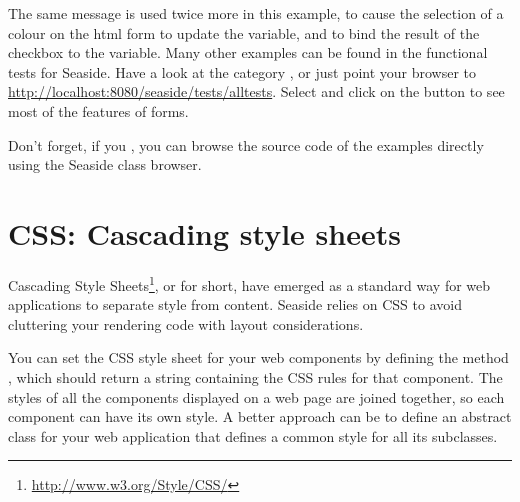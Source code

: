 \documentclass[a4paper,10pt,twoside]{book}
\begin{document}
{{The same message is used twice more in this example, to cause the selection of a colour on the html form to update the  variable, and to bind the result of the checkbox to the  variable.
Many other examples can be found in the functional tests for Seaside.
Have a look at the category , or just point your browser to \url{http://localhost:8080/seaside/tests/alltests}.
Select  and click on the  button to see most of the features of forms.

Don't forget, if you , you can browse the source code of the examples directly using the Seaside class browser.

\section{CSS: Cascading style sheets}


Cascading Style Sheets\footnote{\url{http://www.w3.org/Style/CSS/}}, or  for short, have emerged as a standard way for web applications to separate style from content.
Seaside relies on CSS to avoid cluttering your rendering code with layout considerations.

You can set the CSS style sheet for your web components by defining the method , which should return a string containing the CSS rules for that component.
The styles of all the components displayed on a web page are joined together, so each component can have its own style.
A better approach can be to define an abstract class for your web application that defines a common style for all its subclasses.

}}
\end{document}
